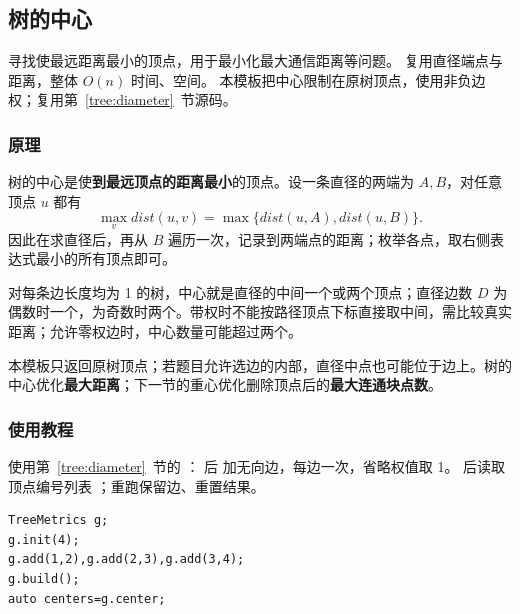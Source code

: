 \subsection{树的中心}
\label{tree:center}
\AlgorithmInfo
    {寻找使最远距离最小的顶点，用于最小化最大通信距离等问题。}
    {复用直径端点与距离，整体 $O(n)$ 时间、空间。}
    {本模板把中心限制在原树顶点，使用非负边权；复用第~\ref{tree:diameter}~节源码。}
\subsubsection*{原理}
树的中心是使\textbf{到最远顶点的距离最小}的顶点。设一条直径的两端为 $A,B$，对任意顶点 $u$ 都有
\[
    \max_v dist(u,v)=\max\{dist(u,A),dist(u,B)\}.
\]
因此在求直径后，再从 $B$ 遍历一次，记录到两端点的距离；枚举各点，取右侧表达式最小的所有顶点即可。

对每条边长度均为 1 的树，中心就是直径的中间一个或两个顶点；直径边数 $D$ 为偶数时一个，为奇数时两个。带权时不能按路径顶点下标直接取中间，需比较真实距离；允许零权边时，中心数量可能超过两个。

本模板只返回原树顶点；若题目允许选边的内部，直径中点也可能位于边上。树的中心优化\textbf{最大距离}；下一节的重心优化删除顶点后的\textbf{最大连通块点数}。

\subsubsection*{使用教程}
使用第~\ref{tree:diameter}~节的 ： 后  加无向边，每边一次，省略权值取 1。 后读取顶点编号列表 ；重跑保留边、重置结果。
\begin{lstlisting}[style=mtycpp,numbers=none]
TreeMetrics g;
g.init(4);
g.add(1,2),g.add(2,3),g.add(3,4);
g.build();
auto centers=g.center;
\end{lstlisting}
